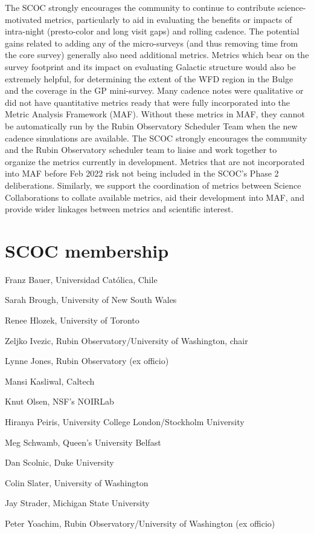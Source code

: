 The SCOC strongly encourages the community to continue to contribute science-motivated metrics, particularly to aid in evaluating the benefits or impacts of intra-night (presto-color and long visit gaps) and rolling cadence. The potential gains related to adding any of the micro-surveys (and thus removing time from the core survey) generally also need additional metrics. Metrics which bear on the survey footprint and its impact on evaluating Galactic structure would also be extremely helpful, for determining the extent of the WFD region in the Bulge and the coverage in the GP mini-survey. Many cadence notes were qualitative or did not have quantitative metrics ready that were fully incorporated into the Metric Analysis Framework (MAF). Without these metrics in MAF, they cannot be automatically run by the Rubin Observatory Scheduler Team when the new cadence simulations are available.  The SCOC strongly encourages the community and the Rubin Observatory scheduler team to liaise and work together to organize the metrics currently in development. Metrics that are not incorporated into MAF before Feb 2022 risk not being included in the SCOC’s Phase 2 deliberations. Similarly, we support the coordination of metrics between Science Collaborations to collate available metrics, aid their development into MAF, and provide wider linkages between metrics and scientific interest. 

\section{SCOC membership}

 Franz Bauer, Universidad Católica, Chile

 Sarah Brough, University of New South Wales 

 Renee Hlozek, University of Toronto

 Zeljko Ivezic, Rubin Observatory/University of Washington, chair

 Lynne Jones, Rubin Observatory (ex officio)

 Mansi Kasliwal, Caltech 

 Knut Olsen, NSF’s NOIRLab 

 Hiranya Peiris, University College London/Stockholm University

 Meg Schwamb, Queen's University Belfast

 Dan Scolnic, Duke University

 Colin Slater, University of Washington  

 Jay Strader, Michigan State University

 Peter Yoachim, Rubin Observatory/University of Washington (ex officio)

